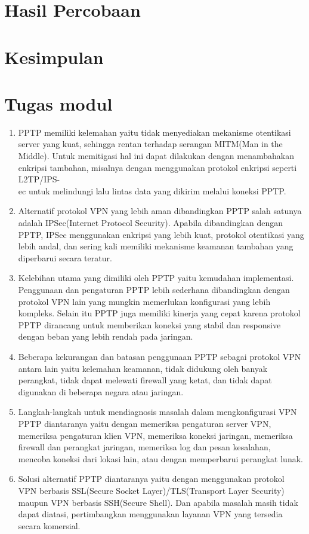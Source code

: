 \section{Hasil Percobaan}


\section{Kesimpulan}


\section{Tugas modul}

\begin{enumerate}
    \item PPTP memiliki kelemahan yaitu tidak menyediakan mekanisme otentikasi server yang kuat, sehingga rentan terhadap serangan MITM(Man in the Middle). Untuk memitigasi hal ini dapat dilakukan dengan menambahakan enkripsi tambahan, misalnya dengan menggunakan protokol enkripsi seperti L2TP/IPS-\\ec untuk melindungi lalu lintas data yang dikirim melalui koneksi PPTP.

    \item Alternatif protokol VPN yang lebih aman dibandingkan PPTP salah satunya adalah IPSec(Internet Protocol Security). Apabila dibandingkan dengan PPTP, IPSec menggunakan enkripsi yang lebih kuat, protokol otentikasi yang lebih andal, dan sering kali memiliki mekanisme keamanan tambahan yang diperbarui secara teratur.
    
    \item Kelebihan utama yang dimiliki oleh PPTP yaitu kemudahan implementasi. Penggunaan dan pengaturan PPTP lebih sederhana dibandingkan dengan protokol VPN lain yang mungkin memerlukan konfigurasi yang lebih kompleks. Selain itu PPTP juga memiliki kinerja yang cepat karena protokol PPTP dirancang untuk memberikan koneksi yang stabil dan responsive dengan beban yang lebih rendah pada jaringan.
    
    \item Beberapa kekurangan dan batasan penggunaan PPTP sebagai protokol VPN antara lain yaitu kelemahan keamanan, tidak didukung oleh banyak perangkat, tidak dapat melewati firewall yang ketat, dan tidak dapat digunakan di beberapa negara atau jaringan.
    
    \item Langkah-langkah untuk mendiagnosis masalah dalam mengkonfigurasi VPN PPTP diantaranya yaitu dengan memeriksa pengaturan server VPN, memeriksa pengaturan klien VPN, memeriksa koneksi jaringan, memeriksa firewall dan perangkat jaringan, memeriksa log dan pesan kesalahan, mencoba koneksi dari lokasi lain, atau dengan memperbarui perangkat lunak.
    
    \item Solusi alternatif PPTP diantaranya yaitu dengan menggunakan protokol VPN berbasis SSL(Secure Socket Layer)/TLS(Transport Layer Security) maupun VPN berbasis SSH(Secure Shell). Dan apabila masalah masih tidak dapat diatasi, pertimbangkan menggunakan layanan VPN yang tersedia secara komersial.
    
\end{enumerate}